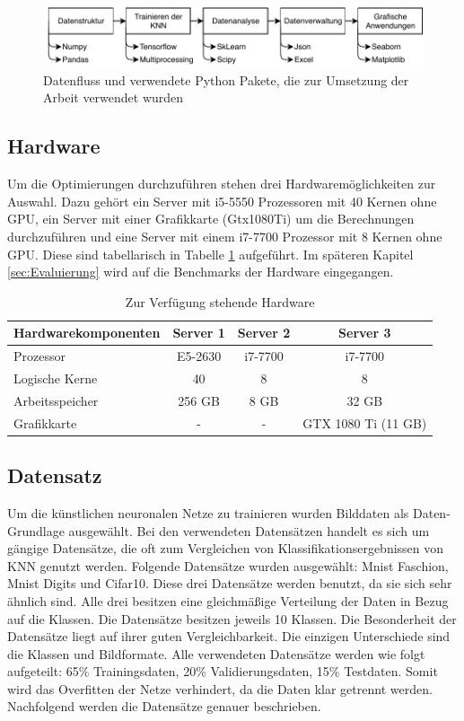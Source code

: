\begin{figure}[H]
  \centering  
  \includegraphics[scale=1]{img/Python_pakete.pdf}
  \caption{Datenfluss und verwendete Python Pakete, die zur Umsetzung der Arbeit verwendet wurden}
  \label{fig:Python_pakete}
\end{figure}

\subsection{Hardware}
Um die Optimierungen durchzuführen stehen drei Hardwaremöglichkeiten zur Auswahl. Dazu gehört ein Server mit i5-5550 Prozessoren mit 40 Kernen ohne GPU, ein Server mit einer Grafikkarte (Gtx1080Ti) um die Berechnungen durchzuführen und eine Server mit einem i7-7700 Prozessor mit 8 Kernen ohne GPU. Diese sind tabellarisch in Tabelle \ref{tab:Server} aufgeführt. Im späteren Kapitel \ref{sec:Evaluierung} wird auf die Benchmarks der Hardware eingegangen.

\begin{table}[htb]
\centering
\caption{Zur Verfügung stehende Hardware} \label{tab:Server}
\begin{tabular}{lccc}\toprule
\textbf{Hardwarekomponenten}	&\textbf{Server 1} &\textbf{Server 2} &\textbf{Server 3}	\\\midrule
Prozessor		& E5-2630   & i7-7700	& i7-7700 \\
Logische Kerne 	& 40        & 8     	& 8 	\\
Arbeitsspeicher	& 256 GB    & 8 GB	    & 32 GB	\\
Grafikkarte		& -	        & -	        & GTX 1080 Ti (11 GB)	\\\bottomrule
\end{tabular}
\end{table}


\subsection{Datensatz}
Um die künstlichen neuronalen Netze zu trainieren wurden Bilddaten als Daten-Grundlage ausgewählt. Bei den verwendeten Datensätzen handelt es sich um gängige Datensätze, die oft zum Vergleichen von Klassifikationsergebnissen von KNN genutzt werden. Folgende Datensätze wurden ausgewählt: Mnist Faschion, Mnist Digits und Cifar10. Diese drei Datensätze werden benutzt, da sie sich sehr ähnlich sind. Alle drei besitzen eine gleichmäßige Verteilung der Daten in Bezug auf die Klassen. Die Datensätze besitzen jeweils 10 Klassen. Die Besonderheit der Datensätze liegt auf ihrer guten Vergleichbarkeit. Die einzigen Unterschiede sind die Klassen und Bildformate. Alle verwendeten Datensätze werden wie folgt aufgeteilt: 65\% Trainingsdaten, 20\% Validierungsdaten, 15\% Testdaten. Somit wird das Overfitten der Netze verhindert, da die Daten klar getrennt werden. Nachfolgend werden die Datensätze genauer beschrieben.

